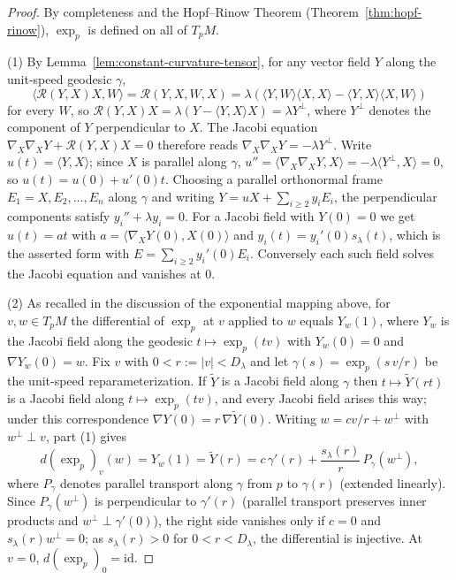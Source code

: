 \begin{proof}
By completeness and the Hopf--Rinow Theorem
(Theorem~\ref{thm:hopf-rinow}), $\exp_p$ is defined on all of
$T_pM$.

(1) By Lemma~\ref{lem:constant-curvature-tensor}, for any vector
field $Y$ along the unit-speed geodesic $\gamma$,
$$\langle{\mathcal R}(Y,X)X,W\rangle={\mathcal R}(Y,X,W,X)
=\lambda\left(\langle Y,W\rangle\langle X,X\rangle
-\langle Y,X\rangle\langle X,W\rangle\right)$$
for every $W$, so ${\mathcal R}(Y,X)X=\lambda\left(Y-\langle
Y,X\rangle X\right)=\lambda Y^\perp$, where $Y^\perp$ denotes the
component of $Y$ perpendicular to $X$. The Jacobi equation
$\nabla_X\nabla_XY+{\mathcal R}(Y,X)X=0$ therefore reads
$\nabla_X\nabla_XY=-\lambda Y^\perp$. Write $u(t)=\langle
Y,X\rangle$; since $X$ is parallel along $\gamma$,
$u''=\langle\nabla_X\nabla_XY,X\rangle=-\lambda\langle
Y^\perp,X\rangle=0$, so $u(t)=u(0)+u'(0)t$. Choosing a parallel
orthonormal frame $E_1=X,E_2,\ldots,E_n$ along $\gamma$ and writing
$Y=uX+\sum_{i\ge 2}y_iE_i$, the perpendicular components satisfy
$y_i''+\lambda y_i=0$. For a Jacobi field with $Y(0)=0$ we get
$u(t)=at$ with $a=\langle \nabla_XY(0),X(0)\rangle$ and
$y_i(t)=y_i'(0)s_\lambda(t)$, which is the asserted form with
$E=\sum_{i\ge2}y_i'(0)E_i$. Conversely each such field solves the
Jacobi equation and vanishes at $0$.

(2) As recalled in the discussion of the exponential mapping above,
for $v,w\in T_pM$ the differential of $\exp_p$ at $v$
applied to $w$ equals $Y_w(1)$, where $Y_w$ is the Jacobi field
along the geodesic $t\mapsto\exp_p(tv)$ with $Y_w(0)=0$ and
$\nabla Y_w(0)=w$. Fix $v$ with $0<r:=|v|<D_\lambda$ and let
$\gamma(s)=\exp_p(s\,v/r)$ be the unit-speed reparameterization. If
$\widetilde Y$ is a Jacobi field along $\gamma$ then
$t\mapsto\widetilde Y(rt)$ is a Jacobi field along
$t\mapsto\exp_p(tv)$, and every Jacobi field arises this way; under
this correspondence $\nabla Y(0)=r\,\nabla\widetilde Y(0)$.
Writing $w=cv/r+w^\perp$ with $w^\perp\perp v$, part (1) gives
\begin{equation}\label{dexpformula}
d(\exp_p)_v(w)=Y_w(1)=\widetilde Y(r)
=c\,\gamma'(r)+\frac{s_\lambda(r)}{r}\,P_\gamma(w^\perp),
\end{equation}
where $P_\gamma$ denotes parallel transport along $\gamma$ from $p$
to $\gamma(r)$ (extended linearly). Since $P_\gamma(w^\perp)$ is
perpendicular to $\gamma'(r)$ (parallel transport preserves inner
products and $w^\perp\perp\gamma'(0)$), the right side vanishes only
if $c=0$ and $s_\lambda(r)w^\perp=0$; as $s_\lambda(r)>0$ for
$0<r<D_\lambda$, the differential is injective. At $v=0$,
$d(\exp_p)_0=\mathrm{id}$.


\end{proof}

